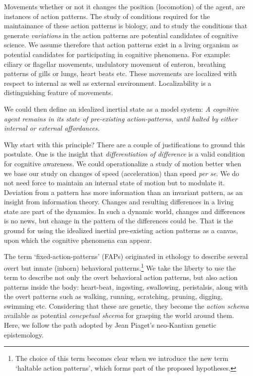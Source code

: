Movements whether or not it changes the position (locomotion) of the agent, are instances of action patterns. The study of conditions required for the maintainance of these action patterns is biology, and to study the conditions that generate \textit{variations} in the action patterns are potential candidates of cognitive science.  
We assume therefore that action patterns exist in a living organism as potential candidates for participating in cognitive phenomena. For example: ciliary or flagellar movements, undulatory movement of enteron, breathing patterns of gills or lungs, heart beats etc.  These movements are localized with respect to internal as well as external environment. Localizability is a distinguishing feature of movements. 

We could then define an idealized inertial state as a model system:  \textit{A cognitive agent remains in its state of pre-existing action-patterns, until halted by either internal or external affordances.} 

Why start with this principle?  There are a couple of justifications to ground this postulate. One is the insight that \textit{differentiation of difference} is a valid condition for cognitive awareness.\cite{bateson2000steps} We could operationalize a study of motion better when we base our study on changes of speed (acceleration) than speed \textit{per se}. We do not need force to maintain an internal state of motion but to modulate it. Deviation from a pattern has more information than an invariant pattern, as an insight from information theory.  Changes and resulting differences in a living state are part of the dynamics. In such a dynamic world, changes and differences is no news, but change in the pattern of the differences could be. That is the ground for using the idealized inertial pre-existing action patterns as a canvas, upon which the cognitive phenomena can appear. 

The term `fixed-action-patterns' (FAPs) originated in ethology to describe several overt but innate (inborn) behavioral patterns.\footnote{The choice of this term becomes clear when we introduce the new term `haltable action patterns', which forms part of the proposed hypotheses.} We take the liberty to use the term to describe not only the overt behavioral action patterns, but also action patterns inside the body: heart-beat, ingesting, swallowing, peristalsis, along with the overt patterns such as walking, running, scratching, pruning, digging, swimming etc.  Considering that these are genetic, they become the \textit{action schema} available as potential \textit{concpetual shcema} for grasping the world around them.  Here, we follow the path adopted by Jean Piaget's neo-Kantian genetic epistemology.\cite{piaget-biology-knowledge}

